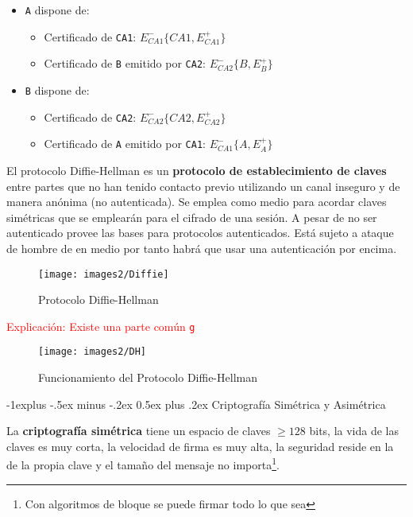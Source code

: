 \documentclass[10pt,portrait, twocolumn]{article}
\makeatletter
\renewcommand{\subsection}{\@startsection{subsection}{2}{0mm}%
                                {-1explus -.5ex minus -.2ex}%
                                {0.5ex plus .2ex}%
                                {\normalfont\normalsize\bfseries}}
\makeatother
\begin{document}
	\begin{itemize}
		\item \texttt{A} dispone de:
			\begin{itemize}
				\item Certificado de \texttt{CA1}: $E_{CA1}^- \{ CA1, E^+_{CA1} \}$
				\item Certificado de \texttt{B} emitido por \texttt{CA2}: $E_{CA2}^- \{ B, E^+_{B} \}$
			\end{itemize}
		\item \texttt{B} dispone de:
			\begin{itemize}
				\item Certificado de \texttt{CA2}: $E_{CA2}^- \{ CA2, E^+_{CA2} \}$
				\item Certificado de \texttt{A} emitido por \texttt{CA1}: $E_{CA1}^- \{ A, E^+_{A} \}$
			\end{itemize}
	\end{itemize}	
	
El protocolo Diffie-Hellman es un \textbf{protocolo de establecimiento de claves} entre partes que no han tenido contacto previo utilizando un canal inseguro y de manera anónima (no autenticada). Se emplea como medio para acordar claves simétricas que se emplearán para el cifrado de una sesión. A pesar de no ser autenticado provee las bases para protocolos autenticados. Está sujeto a ataque de hombre de en medio por tanto habrá que usar una autenticación por encima.

	\begin{figure}[ht!]
	\centering
	\texttt{[image: images2/Diffie]}
	\caption{Protocolo Diffie-Hellman}
	\label{figure:Planta1}
	\end{figure}
	
\textcolor{red}{Explicación: Existe una parte común \texttt{g}}	

	\begin{figure}[ht!]
	\centering
	\texttt{[image: images2/DH]}
	\caption{Funcionamiento del Protocolo Diffie-Hellman}
	\label{figure:Planta1}
	\end{figure}

\subsection{Criptografía Simétrica y Asimétrica}

La \textbf{criptografía simétrica} tiene un espacio de claves $\geq 128$ bits, la vida de las claves es muy corta, la velocidad de firma es muy alta, la seguridad reside en la de la propia clave y el tamaño del mensaje no importa\footnote{Con algoritmos de bloque se puede firmar todo lo que sea}. 
\end{document}
